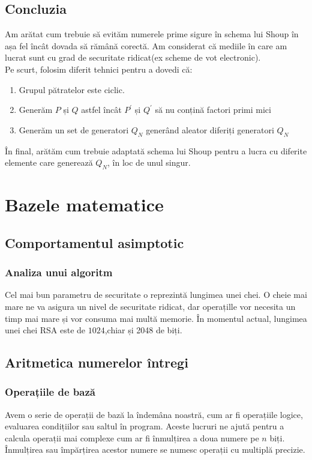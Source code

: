 \documentclass[12]{report}
\begin{document}
\subsection{Concluzia}
Am arătat cum trebuie să evităm numerele prime sigure în schema lui Shoup în așa fel încât dovada să rămână corectă. Am considerat că mediile în care am lucrat sunt cu grad de securitate ridicat(ex scheme de vot electronic).
\\ Pe scurt, folosim diferit tehnici pentru a dovedi că:
\begin{enumerate}
\item Grupul pătratelor este ciclic.

\item Generăm $P$ și $Q$ astfel încât $P^{'}$ și $Q^{'}$ să nu conțină factori primi mici

\item Generăm un set de generatori $Q_N$ generând aleator diferiți generatori $Q_N$
\end{enumerate} 
În final, arătăm cum trebuie adaptată schema lui Shoup pentru a lucra cu diferite elemente care generează $Q_N$, în loc de unul singur.


\section{Bazele matematice} 
    \subsection{Comportamentul asimptotic}
     \subsubsection{Analiza unui algoritm}
      Cel mai bun parametru de securitate o reprezintă lungimea unei chei. O cheie mai mare ne va
      asigura un nivel de securitate ridicat, dar operațille vor necesita un timp mai mare și vor consuma
      mai multă memorie. În momentul actual, lungimea unei chei RSA este de $1024$,chiar și 2048 de biți.
      
     \subsection{Aritmetica numerelor întregi}
      \subsubsection{Operațiile de bază}
       Avem o serie de operații de bază la îndemâna noastră, cum ar fi operațiile logice, evaluarea condițiilor sau saltul în program. Aceste lucruri ne ajută pentru a calcula operații mai complexe cum ar fi înmulțirea a doua numere pe $n$ biți. Înmulțirea sau împărțirea acestor numere se numesc operații cu multiplă precizie. 
\end{document}
